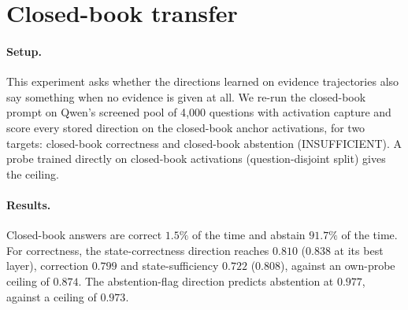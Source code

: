 \section{Closed-book transfer}
\label{app:closedbook}
\paragraph{Setup.} This experiment asks whether the directions learned on evidence trajectories also say something when no evidence is given at all. We re-run the closed-book prompt on Qwen's screened pool of 4{,}000 questions with activation capture and score every stored direction on the closed-book anchor activations, for two targets: closed-book correctness and closed-book abstention (INSUFFICIENT). A probe trained directly on closed-book activations (question-disjoint split) gives the ceiling.

\paragraph{Results.} Closed-book answers are correct $1.5\%$ of the time and abstain $91.7\%$ of the time. For correctness, the state-correctness direction reaches $0.810$ ($0.838$ at its best layer), correction $0.799$ and state-sufficiency $0.722$ ($0.808$), against an own-probe ceiling of $0.874$. The abstention-flag direction predicts abstention at $0.977$, against a ceiling of $0.973$.
